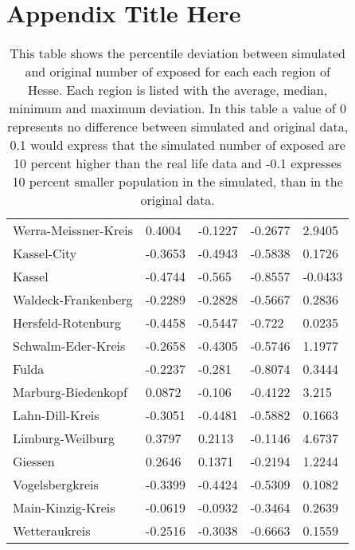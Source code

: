 
\chapter{Appendix Title Here} %
\label{AppendixA} %

\begin{table}
	\caption{This table shows the percentile deviation between simulated and original number of exposed for each each region of Hesse.
		Each region is listed with the average, median, minimum and maximum deviation. In this table a value of 0 represents
		no difference between simulated and original data, 0.1 would express that the simulated number of exposed are 10 percent
		higher than the real life data and -0.1 expresses 10 percent smaller population in the simulated, than in the original data.}
	\begin{tabular}{|l||x{2cm}|x{2cm}|x{2cm}|x{2cm}|}
		\hline 
		 &  &  &  &  \\ \hline\hline
		Werra-Meissner-Kreis & 0.4004 & -0.1227 & -0.2677 & 2.9405 \\ \hline
		Kassel-City & -0.3653 & -0.4943 & -0.5838 & 0.1726 \\ \hline
		Kassel & -0.4744 & -0.565 & -0.8557 & -0.0433 \\ \hline
		Waldeck-Frankenberg & -0.2289 & -0.2828 & -0.5667 & 0.2836 \\ \hline
		Hersfeld-Rotenburg & -0.4458 & -0.5447 & -0.722 & 0.0235 \\ \hline
		Schwalm-Eder-Kreis & -0.2658 & -0.4305 & -0.5746 & 1.1977 \\ \hline
		Fulda & -0.2237 & -0.281 & -0.8074 & 0.3444 \\ \hline
		Marburg-Biedenkopf & 0.0872 & -0.106 & -0.4122 & 3.215 \\ \hline
		Lahn-Dill-Kreis & -0.3051 & -0.4481 & -0.5882 & 0.1663 \\ \hline
		Limburg-Weilburg & 0.3797 & 0.2113 & -0.1146 & 4.6737 \\ \hline
		Giessen & 0.2646 & 0.1371 & -0.2194 & 1.2244 \\ \hline
		Vogelsbergkreis & -0.3399 & -0.4424 & -0.5309 & 0.1082 \\ \hline
		Main-Kinzig-Kreis & -0.0619 & -0.0932 & -0.3464 & 0.2639 \\ \hline
		Wetteraukreis & -0.2516 & -0.3038 & -0.6663 & 0.1559 \\ \hline

\end{tabular}
\end{table}

